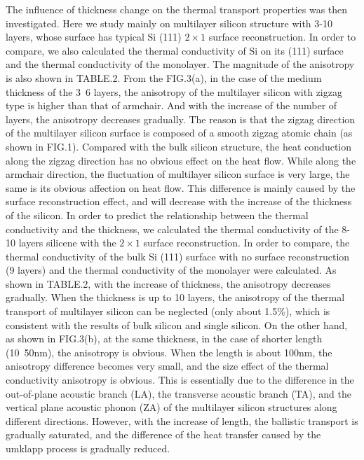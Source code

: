 \documentclass[%
 reprint,
 amsmath,amssymb,
 aps,
 prb,
]{revtex4-1}
\begin{document}
The influence of thickness change on the thermal transport properties was then investigated. Here we study mainly on multilayer silicon structure with 3-10 layers, whose  surface has typical Si (111) $2 \times 1$ surface reconstruction. In order to compare, we also calculated the thermal conductivity of Si on its (111) surface and the thermal conductivity of the monolayer. The magnitude of the anisotropy is also shown in TABLE.2. From the FIG.3(a), in the case of the medium thickness of the 3~6 layers, the anisotropy of the multilayer silicon with zigzag type is higher than that of armchair. And with the increase of the number of layers, the anisotropy decreases gradually. The reason is that the zigzag direction of the multilayer silicon surface is composed of a smooth zigzag atomic chain (as shown in FIG.1). Compared with the bulk silicon structure, the heat conduction along the zigzag direction has no obvious effect on the heat flow. While along the armchair direction, the fluctuation of multilayer silicon surface is very large, the same is its obvious affection on heat flow. This difference is mainly caused by the surface reconstruction effect, and will decrease with the increase of the thickness of the silicon. In order to predict the relationship between the thermal conductivity and the thickness, we calculated the thermal conductivity of the 8-10 layers silicene with the $2 \times 1$ surface reconstruction. In order to compare, the thermal conductivity of the bulk Si (111) surface with no surface reconstruction (9 layers) and the thermal conductivity of the monolayer were calculated. As shown in TABLE.2, with the increase of thickness, the anisotropy decreases gradually. When the thickness is up to 10 layers, the anisotropy of the thermal transport of multilayer silicon can be neglected (only about 1.5\%), which is consistent with the results of bulk silicon and single silicon. On the other hand, as shown in FIG.3(b), at the same thickness, in the case of shorter length (10~50nm), the anisotropy is obvious. When the length is about 100nm, the anisotropy difference becomes very small, and the size effect of the thermal conductivity anisotropy is obvious. This is essentially due to the difference in the out-of-plane acoustic branch (LA), the transverse acoustic branch (TA), and the vertical plane acoustic phonon (ZA) of the multilayer silicon structures along different directions. However, with the increase of length, the ballistic transport is gradually saturated, and the difference of the heat transfer caused by the umklapp process is gradually reduced.
\end{document}
